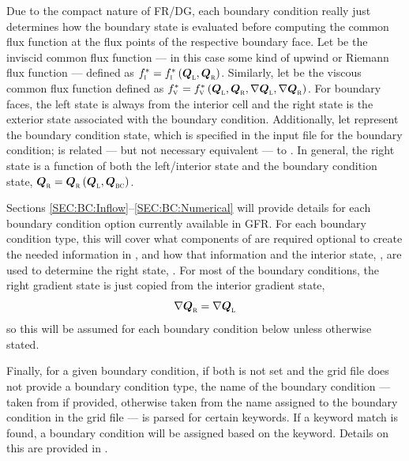 Due to the compact nature of FR\slash DG, each boundary condition really just
determines how the boundary state is evaluated before computing the common flux
function at the flux points of the respective boundary face.
%
Let \fupw[\textsc{i}]{} be the inviscid common flux function --- in this case
some kind of upwind or Riemann flux function --- defined as $\fupw[\textsc{i}] =
\fupw[\textsc{i}] \left( \cvVecL , \cvVecR \right)$.
%
Similarly, let \fupw[\textsc{v}]{} be the viscous common flux function defined
as $\fupw[\textsc{v}] = \fupw[\textsc{v}] \left( \cvVecL,\cvVecR ,
\nabla\cvVecL,\nabla\cvVecR \right)$.
%
For boundary faces, the left state is always from the interior cell and the
right state is the exterior state associated with the boundary condition.
%
Additionally, let \cvVecBC{} represent the boundary condition state, which is
specified in the input file for the boundary condition; \cvVecBC{} is related
--- but not necessary equivalent --- to \cvVecR.
%
In general, the right state is a function of both the left\slash interior state
and the boundary condition state, \thatis $\cvVecR = \cvVecR \left( \cvVecL ,
\cvVecBC \right)$.


Sections \ref{SEC:BC:Inflow}--\ref{SEC:BC:Numerical} will provide details for
each boundary condition option currently available in GFR.
%
For each boundary condition type, this will cover what components of
 are required \andor optional to create the
needed information in \cvVecBC, and how that information and the interior state,
\cvVecL, are used to determine the right state, \cvVecR.
%
For most of the boundary conditions, the right gradient state is just copied
from the interior gradient state, \thatis
%
\begin{equation}
  \nabla\cvVecR=\nabla\cvVecL
  \label{EQ:BC:FlowThroughGradient}
\end{equation}
%
so this will be assumed for each boundary condition below unless otherwise
stated.


Finally, for a given boundary condition, if both  is
not set and the grid file does not provide a boundary condition type, the name
of the boundary condition --- taken from  if provided, otherwise
taken from the name assigned to the boundary condition in the grid file ---
is parsed for certain keywords.
%
If a keyword match is found, a boundary condition will be assigned based on the
keyword.
%
Details on this are provided in .

